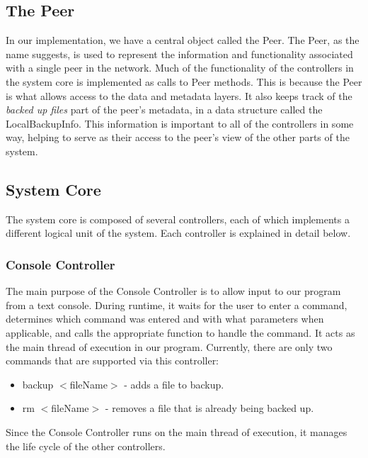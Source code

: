 \documentclass[12pt]{report}
\begin{document}
\subsection{The Peer}
In our implementation, we have a central object called the Peer. The Peer, as the name suggests, is used to represent the information and functionality associated with a single peer in the network. Much of the functionality of the controllers in the system core is implemented as calls to Peer methods. This is because the Peer is what allows access to the data and metadata layers. It also keeps track of the \textit{backed up files} part of the peer's metadata, in a data structure called the LocalBackupInfo. This information is important to all of the controllers in some way, helping to serve as their access to the peer's view of the other parts of the system.

\subsection{System Core}
The system core is composed of several controllers, each of which implements a different logical unit of the system. Each controller is explained in detail below.

\subsubsection{Console Controller}
The main purpose of the Console Controller is to allow input to our program from a text console. During runtime, it waits for the user to enter a command, determines which command was entered and with what parameters when applicable, and calls the appropriate function to handle the command. It acts as the main thread of execution in our program. Currently, there are only two commands that are supported via this controller:
\begin{itemize}
\item backup  $<$fileName$>$ - adds a file to backup.
\item rm $<$fileName$>$ - removes a file that is already being backed up.
\end{itemize}
Since the Console Controller runs on the main thread of execution, it manages the life cycle of the other controllers.
\end{document}
